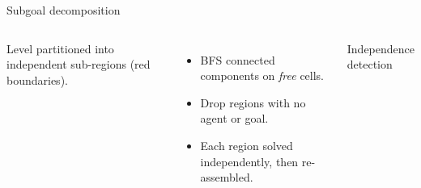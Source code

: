 \begin{frame}{Subgoal decomposition}
  \begin{columns}[T, onlytextwidth]
        {Level partitioned into independent sub-regions (red boundaries).}

      \vspace{1.2cm}
      \begin{itemize}
        \item BFS connected components on \emph{free} cells.
        \item Drop regions with no agent or goal.
        \item Each region solved independently, then re-assembled.
      \end{itemize}
      \vspace{0.6cm}
      \footnotesize\textcolor{muted}{Independence detection}
  \end{columns}
\end{frame}
